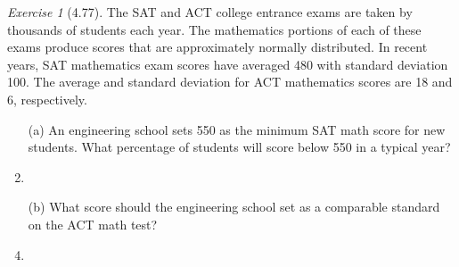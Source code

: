 \documentclass[12pt]{amsart}
\makeatletter
\theoremstyle{remark}
\newtheorem*{exercise}{Exercise}%
\renewenvironment{proof}[1][\proofname]{\par\doublespacing
  \pushQED{\qed}%
  \normalfont \topsep6\p@\@plus6\p@\relax
  \list{}{%
    \settowidth{\leftmargin}{\itshape\proofname:\hskip\labelsep}%
    \setlength{\labelwidth}{0pt}%
    \setlength{\itemindent}{-\leftmargin}%
  }%
  \item[\hskip\labelsep\itshape#1\@addpunct{:}]\ignorespaces
}{%
  \popQED\endlist\@endpefalse
  \singlespacing
}
\theoremstyle{mycomment}
\makeatother
\begin{document}
\begin{exercise}[4.77]
The SAT and ACT college entrance exams are taken by thousands of students each year. The mathematics portions of each of these exams produce scores that are approximately normally distributed. In recent years, SAT mathematics exam scores have averaged 480 with standard deviation 100. The average and standard deviation for ACT mathematics scores are 18 and 6, respectively.

\begin{enumerate}
    \item[(a)] An engineering school sets 550 as the minimum SAT math score for new students. What percentage of students will score below 550 in a typical year?
\begin{proof}[Solution]
 
\end{proof}
    \item[(b)] What score should the engineering school set as a comparable standard on the ACT math test?
\begin{proof}[Solution]
 
\end{proof}
\end{enumerate}
\end{exercise}
 
\end{document}
